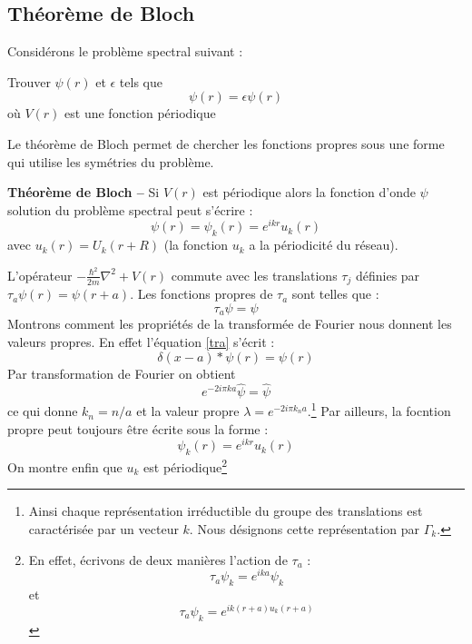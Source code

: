 \documentclass[12pt]{book}
\begin{document}
\subsection{Th\'eor\`eme de Bloch}\label{sectheobloch}
Consid\'erons le probl\`eme spectral suivant :
\begin{prob}
Trouver $\psi(r)$ et $\epsilon$ tels que
\begin{equation}
[-\frac{\hbar^2}{2m}\nabla^2+V(r)]\psi(r)=\epsilon\psi(r)
\end{equation}
o\`u $V(r)$ est une fonction p\'eriodique
\end{prob}
Le th\'eor\`eme de
Bloch\cite{ma:equad:Dautray5,ph:solid:Kittel67,ph:physt:Diu89}
permet de chercher les fonctions
propres sous 
une forme qui utilise les sym\'etries du probl\`eme. 
\begin{thm}\label{theobloch}{\bf Th\'eor\`eme de Bloch --} Si $V(r)$
est p\'eriodique alors 
la fonction d'onde $\psi$ solution du probl\`eme spectral peut
s'\'ecrire : 
\begin{equation}
\psi(r)=\psi_k(r)=e^{ikr}u_k(r)
\end{equation}
avec $ u_k(r)=U_k(r+R)$ (la fonction $u_k$ a la p\'eriodicit\'e du
r\'eseau).  
\end{thm}
\begin{pf}
L'op\'erateur $-\frac{\hbar^2}{2m}\nabla^2+V(r)$ commute avec les
translations $\tau_j$ d\'efinies par $\tau_a\psi(r)=\psi(r+a)$.
Les fonctions propres de $\tau_a$ sont telles que :
\begin{equation}
\tau_a\psi=\psi
\label{tra}
\end{equation}
Montrons comment les propri\'et\'es de la transform\'ee de
Fourier 
nous donnent
les valeurs propres. En effet l'\'equation \ref{tra} s'\'ecrit :
\begin{equation}
\delta(x-a)*\psi(r)=\psi(r)
\end{equation}
Par transformation de Fourier on obtient
\begin{equation}
e^{-2i\pi ka}\hat{\psi}=\hat{\psi}
\end{equation}
ce qui donne $k_n=n/a$ et la valeur propre
$\lambda=e^{-2i\pi k_na}$.\footnote{%
Ainsi chaque repr\'esentation irr\'eductible du groupe des translations
est caract\'eris\'ee par un vecteur $k$. Nous d\'esignons cette
repr\'esentation par $\Gamma_k$.}%
Par ailleurs, la focntion propre peut toujours \^etre \'ecrite sous la forme :
\begin{equation}
\psi_k(r)=e^{ikr}u_k(r)
\end{equation}
On montre enfin que $u_k$ est p\'eriodique\footnote{%
En effet, \'ecrivons de deux mani\`eres l'action de $\tau_a$ :
\begin{equation}
\tau_a\psi_k=e^{ika}\psi_k
\end{equation}
et
\begin{equation}
\tau_a\psi_k=e^{ik(r+a)u_k(r+a)}
\end{equation}
}%
\end{pf}
\end{document}

